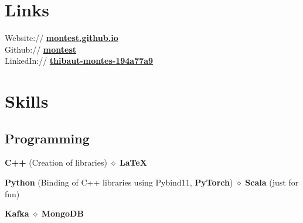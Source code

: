 \documentclass[]{deedy-resume-openfont}
\begin{document}
\begin{minipage}[t]{0.33\textwidth}

	\vspace{\topsep}
	\vspace{\topsep}
	\section{Links}
	Website:// \href{https://montest.github.io}{\bf montest.github.io} \\
	Github:// \href{https://github.com/montest}{\bf montest} \\
	LinkedIn:// \href{https://www.linkedin.com/in/thibaut-montes-194a77a9}{\bf thibaut-montes-194a77a9}


	\vspace{\topsep}
	\vspace{\topsep}
	\section{Skills}

	\subsection{Programming}
	\vspace{\topsep}
	\begin{tightemize}
		\item {}
		\textbf{C++} (Creation of libraries) $\diamond$ \textbf{\LaTeX} \\
		\item {}
		\textbf{Python} (Binding of C++ libraries using Pybind11, \textbf{PyTorch}) $\diamond$ \textbf{Scala} (just for fun) \\
		\item {}
		\textbf{Kafka} $\diamond$ \textbf{MongoDB}
	\end{tightemize}


\end{minipage}
\end{document}
